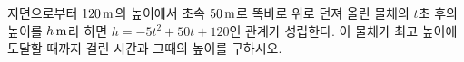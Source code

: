지면으로부터 $120\mkern3mu \mathrm{m}$의 높이에서 초속 $50\mkern3mu \mathrm{m}$로 똑바로 위로 던져 올린 물체의 $t$초 후의 높이를 $h\mkern3mu \mathrm{m}$라 하면 $h=-5t^2+50t+120$인 관계가 성립한다. 이 물체가 최고 높이에 도달할 때까지 걸린 시간과 그때의 높이를 구하시오.
